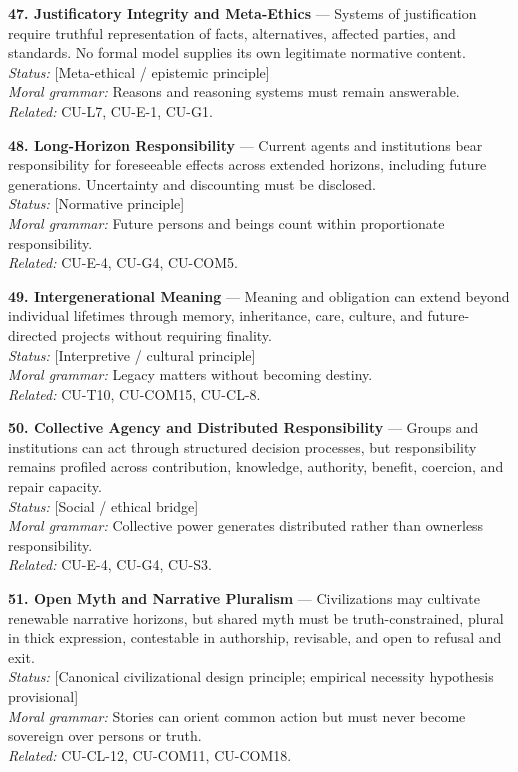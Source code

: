 \documentclass[
  11pt,
]{article}
\begin{document}
\textbf{47. Justificatory Integrity and Meta-Ethics} --- Systems of
justification require truthful representation of facts, alternatives,
affected parties, and standards. No formal model supplies its own
legitimate normative content.\\
\emph{Status:} {[}Meta-ethical / epistemic principle{]}\\
\emph{Moral grammar:} Reasons and reasoning systems must remain
answerable.\\
\emph{Related:} CU-L7, CU-E-1, CU-G1.

\textbf{48. Long-Horizon Responsibility} --- Current agents and
institutions bear responsibility for foreseeable effects across extended
horizons, including future generations. Uncertainty and discounting must
be disclosed.\\
\emph{Status:} {[}Normative principle{]}\\
\emph{Moral grammar:} Future persons and beings count within
proportionate responsibility.\\
\emph{Related:} CU-E-4, CU-G4, CU-COM5.

\textbf{49. Intergenerational Meaning} --- Meaning and obligation can
extend beyond individual lifetimes through memory, inheritance, care,
culture, and future-directed projects without requiring finality.\\
\emph{Status:} {[}Interpretive / cultural principle{]}\\
\emph{Moral grammar:} Legacy matters without becoming destiny.\\
\emph{Related:} CU-T10, CU-COM15, CU-CL-8.

\textbf{50. Collective Agency and Distributed Responsibility} --- Groups
and institutions can act through structured decision processes, but
responsibility remains profiled across contribution, knowledge,
authority, benefit, coercion, and repair capacity.\\
\emph{Status:} {[}Social / ethical bridge{]}\\
\emph{Moral grammar:} Collective power generates distributed rather than
ownerless responsibility.\\
\emph{Related:} CU-E-4, CU-G4, CU-S3.

\textbf{51. Open Myth and Narrative Pluralism} --- Civilizations may
cultivate renewable narrative horizons, but shared myth must be
truth-constrained, plural in thick expression, contestable in
authorship, revisable, and open to refusal and exit.\\
\emph{Status:} {[}Canonical civilizational design principle; empirical
necessity hypothesis provisional{]}\\
\emph{Moral grammar:} Stories can orient common action but must never
become sovereign over persons or truth.\\
\emph{Related:} CU-CL-12, CU-COM11, CU-COM18.
\end{document}

